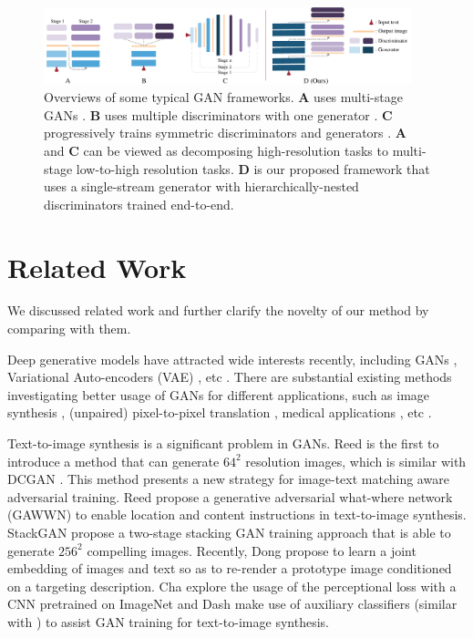 \documentclass[10pt,twocolumn,letterpaper]{article}
\begin{document}
\begin{figure}[t]
	\centering
	\includegraphics[width=0.95\textwidth]{figure/views2.pdf}
	\vspace{-.2cm}
	\caption{Overviews of some typical GAN frameworks. \textbf{A} uses multi-stage GANs \cite{han2017stackgan,denton2015deep}. \textbf{B} uses multiple discriminators with one generator \cite{durugkar2016generative,tu_etal_nips17_d2gan}. \textbf{C} progressively trains symmetric discriminators and generators \cite{Karras2017progressive,huang2016stacked}. \textbf{A} and \textbf{C} can be viewed as decomposing high-resolution tasks to multi-stage low-to-high resolution tasks.  \textbf{D} is our proposed framework that uses a single-stream generator with hierarchically-nested discriminators trained end-to-end.} \label{fig:archs-review} \vspace{-.4cm}
\end{figure}


\section{Related Work}
We discussed related work and further clarify the novelty of our method by comparing with them.

Deep generative models have attracted wide interests recently, including GANs \cite{goodfellow2014generative}, Variational Auto-encoders (VAE) \cite{kingma2013auto}, etc \cite{oord2016pixel}. 
There are substantial existing methods investigating better usage of GANs for different applications, such as image synthesis \cite{radford2015unsupervised, shrivastava2016learning}, (unpaired) pixel-to-pixel translation \cite{isola2016image,zhu2017unpaired}, medical applications \cite{costa2017towards}, etc \cite{ledig2016photo,huang2016stacked}.

Text-to-image synthesis is a significant problem in GANs. Reed \etal \cite{reed2016generative}  is the first to introduce a method that can generate $64^2$ resolution images, which is similar with DCGAN \cite{radford2015unsupervised}. This method presents a new strategy for image-text matching aware adversarial training. Reed \etal \cite{reed2016learning} propose a generative
adversarial what-where network (GAWWN) to enable location and content instructions in text-to-image synthesis. StackGAN \etal \cite{han2017stackgan} propose a two-stage stacking GAN training approach that is able to generate $256^2$ compelling images. Recently, Dong \etal \cite{dong2017semantic} propose to learn a joint embedding of images and text so as to re-render a prototype image conditioned on a targeting description. Cha \etal \cite{char2017perceptual} explore the usage of the perceptional loss \cite{johnson2016perceptual} with a CNN pretrained on ImageNet  and Dash \etal \cite{dash2017tac} make use of auxiliary classifiers (similar with \cite{odena2016conditional}) to assist GAN training for text-to-image synthesis. 
	
\end{document}
